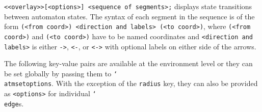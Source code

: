 \documentclass{article}
\newenvironment{desc}{\itemize[leftmargin=50pt]}{\enditemize}
\def\macroarg#1#2{\item[\cmd{#1}] \hskip-2.5pt\texttt{#2}}
\renewcommand{\textbackslash}{\char`\\}
\def\cmd#1{\texttt{\color{cmd}\textbackslash#1}}
\def\optarg[#1]{{\color{player1}[#1]}}
\begin{document}
\begin{desc}
\macroarg{edge}{<<overlay>>\optarg[<options>] <sequence of segments>;} displays state transitions between automaton states. The syntax of each segment in the sequence is of the form \texttt{(<from coord>) <direction and labels> (<to coord>)}, where \texttt{(<from coord>)} and \texttt{(<to coord>)} have to be named coordinates and \texttt{<direction and labels>} is either \texttt{->}, \texttt{<-}, or \texttt{<->} with optional labels on either side of the arrows.
\end{desc}

\noindent The following key-value pairs are available at the environment level or they can be set globally by passing them to \cmd{atmsetoptions}. With the exception of the \texttt{radius} key, they can also be provided as \texttt{<options>} for individual \cmd{edge}s.
\end{document}
